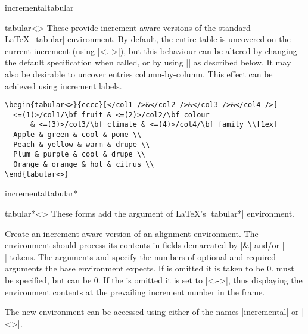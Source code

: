 \documentclass[a4paper]{ltxdoc}
\begin{document}
\begin{environment}{{incrementaltabular}}
\end{environment}
\begin{environment}{{tabular<>}}
  These provide increment-aware versions of the standard \LaTeX\ |tabular|
  environment.  By default, the entire table is uncovered on the current
  increment (using |<.->|), but this behaviour can be altered by changing the
  default specification when called, or by using |\setincrementalenvspec| as
  described below.  It may also be desirable to uncover entries
  column-by-column.  This effect can be achieved using increment labels.
  \example
\begin{verbatim}
\begin{tabular<>}{cccc}[</col1-/>&</col2-/>&</col3-/>&</col4-/>]
  <=(1)>/col1/\bf fruit & <=(2)>/col2/\bf colour  
      & <=(3)>/col3/\bf climate & <=(4)>/col4/\bf family \\[1ex]
  Apple & green & cool & pome \\
  Peach & yellow & warm & drupe \\
  Plum & purple & cool & drupe \\
  Orange & orange & hot & citrus \\
\end{tabular<>}  
\end{verbatim}
\end{environment}

\begin{environment}{{incrementaltabular*}}
\end{environment}
\begin{environment}{{tabular*<>}}
  These forms add the  argument of \LaTeX's |tabular*| environment.
\end{environment}


\begin{command}{{\CreateIncrementalAlignmentEnvironment}}
  Create an increment-aware version of an alignment environment.  The 
  environment should process its contents in fields demarcated by |&| and/or
  |\\| tokens.  The arguments  and  specify the
  numbers of optional and required arguments the base environment expects.  If
   is omitted it is taken to be 0.   must be
  specified, but can be 0.  If the  is omitted it is
  set to |<.->|, thus displaying the environment contents at the prevailing
  increment number in the frame.

  The new environment can be accessed using either of the names
  |incremental| or |<>|.
\end{command}
\end{document}
